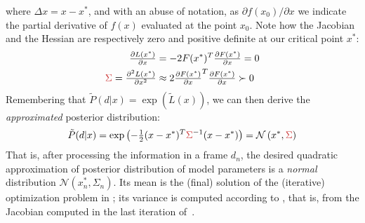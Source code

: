%
where $\Delta x=x - x^*$, and with an abuse of notation, as $\partial f(x_0)/\partial x$ we indicate the partial derivative of $f(x)$ evaluated at the point $x_0$. Note how the Jacobian and the Hessian are respectively zero and positive definite at our critical point $x^*$:
%
\begin{align}
\tfrac{\partial L(x^*)}{\partial x} &= - 2 F(x^*)^T 
\tfrac{\partial F(x^*)}{\partial x} = 0 
\label{eq:taylor-jacobian}
\\
\todo{\Sigma} = \tfrac{\partial^2 L(x^*)}{\partial x^2} 
& \approx 2
\tfrac{\partial F(x^*)}{\partial x}^T  
\tfrac{\partial F(x^*)}{\partial x}
\succ 0
\label{eq:taylor-hessian}
\end{align}
% 
Remembering that $\tilde P(d|x) = \exp (\tilde{L}(x))$, we can then derive the \emph{approximated} posterior distribution:
%
\begin{align}
\tilde{P}(d|x) = \exp\left(- \tfrac{1}{2}(x - x^*)^T \todo{\Sigma}^{-1}  (x - x^*) \right) = \mathcal{N}\left(\star{x}, \todo{\Sigma} \right)
\end{align}
%
That is, after processing the information in a frame $d_n$, the desired quadratic approximation of posterior distribution of model parameters is a \emph{normal} distribution $\mathcal{N}\left(x_n^*, \Sigma_n \right)$.
Its mean is the (final) solution of the (iterative) optimization problem in ; its variance is computed according to , that is, from the Jacobian computed in the last iteration of~. 
% 

